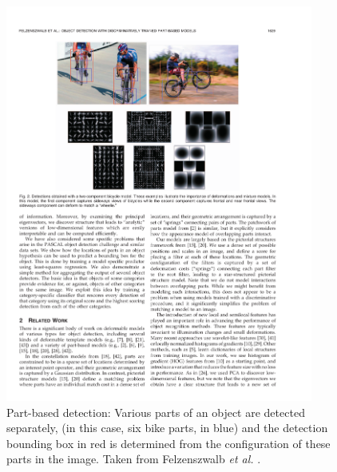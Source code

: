 \begin{figure}[hbt]
    \centering
    \includegraphics[width=0.9\textwidth]{PartBasedDet}
    \caption{Part-based detection: Various parts of an object are detected separately, (in this case, six bike parts, in blue) and the detection bounding box in red is determined from the configuration of these parts in the image. Taken from Felzenszwalb \emph{et al.} \cite{felzenszwalb2010object}. }
    \label{fig:partbaseddet}
\end{figure}

